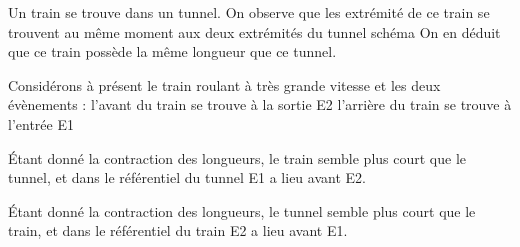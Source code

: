 Un train se trouve dans un tunnel. On observe que les extrémité de ce train se trouvent au même moment aux deux extrémités du tunnel
	schéma
On en déduit que ce train possède la même longueur que ce tunnel.

Considérons à présent le train roulant à très grande vitesse et les deux évènements : 
l'avant du train se trouve à la sortie E2
l'arrière du train se trouve à l'entrée E1

Étant donné la contraction des longueurs, le train semble plus court que le tunnel, et dans le référentiel du tunnel E1 a lieu avant E2.

Étant donné la contraction des longueurs, le tunnel semble plus court que le train, et dans le référentiel du train E2 a lieu avant E1.
